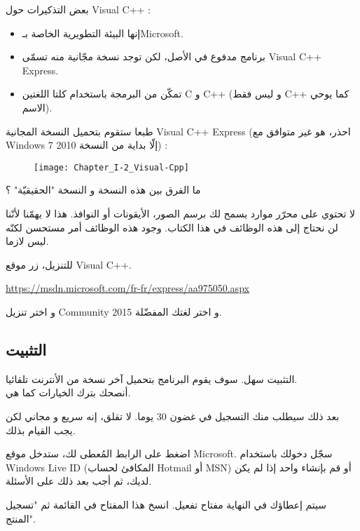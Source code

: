 بعض التذكيرات حول
\textenglish{Visual C++} :

\begin{itemize}
  \item إنها البيئة التطويرية الخاصة بـ\textenglish{Microsoft}.
  \item برنامج مدفوع في الأصل، لكن توجد نسخة مجّانية منه تسمّى \textenglish{Visual C++ Express}.
  \item تمكّن من البرمجة باستخدام كلتا اللغتين
\textenglish{C}
و
\textenglish{C++}
(و ليس فقط
\textenglish{C++}
كما يوحي الاسم).
\end{itemize}

طبعا ستقوم بتحميل النسخة المجانية
\textenglish{Visual C++ Express}
(احذر، هو غير متوافق مع
\textenglish{Windows 7}
إلّا بداية من النسخة 2010) :

\begin{figure}[H]
	\centering
	\texttt{[image: Chapter\_I-2\_Visual-Cpp]}
\end{figure}

\begin{question}
ما الفرق بين هذه النسخة و النسخة "الحقيقيّة" ؟
\end{question}

لا تحتوي على محرّر موارد يسمح لك برسم الصور، الأيقونات أو النوافذ. هذا لا يهمّنا لأنّنا لن نحتاج إلى هذه الوظائف في هذا الكتاب. وجود هذه الوظائف أمر مستحسن لكنّه ليس لازما.

للتنزيل، زر موقع
\textenglish{Visual C++}.

\url{https://msdn.microsoft.com/fr-fr/express/aa975050.aspx}

و اختر تنزيل
\textenglish{Community 2015}
و اختر لغتك المفضّلة.

\subsection{التثبيت}

التثبيت سهل. سوف يقوم البرنامج بتحميل آخر نسخة من الأنترنت تلقائيا.\\
أنصحك بترك الخيارات كما هي.

بعد ذلك سيطلب منك التسجيل في غضون 30 يوما. لا تقلق، إنه سريع و مجاني لكن يجب القيام بذلك.

اضغط على الرابط المُعطى لك، ستدخل موقع
\textenglish{Microsoft}.
سجّل دخولك باستخدام
\textenglish{Windows Live ID}
(المكافئ لحساب
\textenglish{Hotmail}
أو
\textenglish{MSN})
أو قم بإنشاء واحد إذا لم يكن لديك، ثم أجب بعد ذلك على الأسئلة.

سيتم إعطاؤك في النهاية مفتاح تفعيل. انسخ هذا المفتاح في القائمة
ثم
"تسجيل المنتج".

